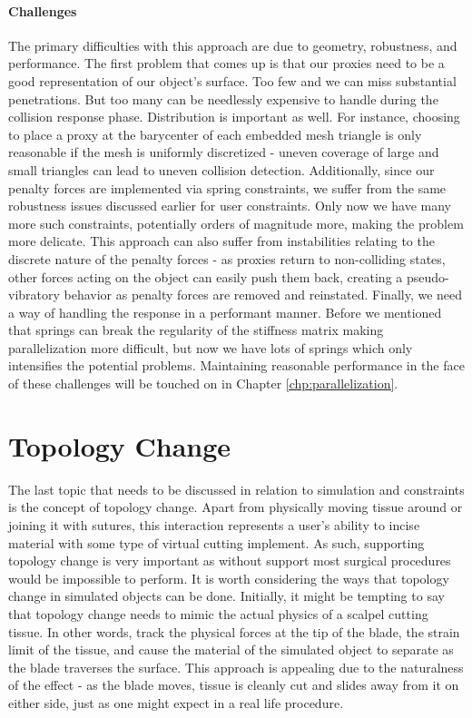   \paragraph{Challenges} The primary difficulties with this approach
  are due to geometry, robustness, and performance. The first problem
  that comes up is that our proxies need to be a good representation
  of our object's surface. Too few and we can miss substantial
  penetrations. But too many can be needlessly expensive to handle
  during the collision response phase. Distribution is important as
  well. For instance, choosing to place a proxy at the barycenter of
  each embedded mesh triangle is only reasonable if the mesh is
  uniformly discretized - uneven coverage of large and small triangles
  can lead to uneven collision detection. Additionally, since our
  penalty forces are implemented via spring constraints, we suffer
  from the same robustness issues discussed earlier for user
  constraints. Only now we have many more such constraints,
  potentially orders of magnitude more, making the problem more
  delicate. This approach can also suffer from instabilities relating
  to the discrete nature of the penalty forces - as proxies return to
  non-colliding states, other forces acting on the object can easily
  push them back, creating a pseudo-vibratory behavior as penalty
  forces are removed and reinstated.  Finally, we need a way of
  handling the response in a performant manner. Before we mentioned
  that springs can break the regularity of the stiffness matrix making
  parallelization more difficult, but now we have lots of springs
  which only intensifies the potential problems.  Maintaining reasonable
  performance in the face of these challenges will be touched on in
  Chapter \ref{chp:parallelization}.

\section{Topology Change}

  The last topic that needs to be discussed in relation to simulation
  and constraints is the concept of topology change. Apart from physically
  moving tissue around or joining it with sutures, this interaction
  represents a user's ability to incise material with some type of
  virtual cutting implement. As such, supporting topology change is very
  important as without support most surgical procedures would be impossible to
  perform. It is worth considering the ways that topology change in
  simulated objects can be done. Initially, it might be tempting to
  say that topology change needs to mimic the actual physics of a
  scalpel cutting tissue. In other words, track the physical forces at
  the tip of the blade, the strain limit of the tissue, and cause
  the material of the simulated object to separate as the blade
  traverses the surface. This approach is appealing due to the
  naturalness of the effect - as the blade moves, tissue is cleanly
  cut and slides away from it on either side, just as one might expect
  in a real life procedure.

